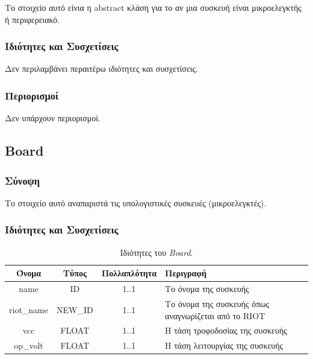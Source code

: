 \noindent Το στοιχείο αυτό είνια η abstract κλάση για το αν μια συσκευή είναι μικροελεγκτής ή περιφερειακό.

\subsubsection*{Ιδιότητες και Συσχετίσεις}

\noindent Δεν περιλαμβάνει περαιτέρω ιδιότητες και συσχετίσεις.

\subsubsection*{Περιορισμοί}

\noindent Δεν υπάρχουν περιορισμοί.

\subsection{Board}
\label{subsec:board}

\subsubsection*{Σύνοψη}

\noindent Το στοιχείο αυτό αναπαριστά τις υπολογιστικές συσκευές (μικροελεγκτές).

\subsubsection*{Ιδιότητες και Συσχετίσεις}

\begin{table}[H]
	\begin{center}
		\caption{Ιδιότητες του \textit{Board}.}
		\label{tab:board1}
		\begin{tabular}{ | c | c | c| m{5.5cm} | }
			\hline
			\rowcolor{Gray}
			Όνομα & Τύπος & Πολλαπλότητα & Περιγραφή \\
			\hline
			name & ID & 1..1 &  Το όνομα της συσκευής \\
			\hline
			riot\_name & NEW\_ID & 1..1 &  Το όνομα της συσκευής όπως αναγνωρίζεται από το RIOT \\
			\hline
			vcc & FLOAT & 1..1 & Η τάση τροφοδοσίας της συσκευής \\
			\hline
			op\_volt & FLOAT & 1..1 &  Η τάση λειτουργίας της συσκευής \\
			\hline
		\end{tabular}
	\end{center}
\end{table}

